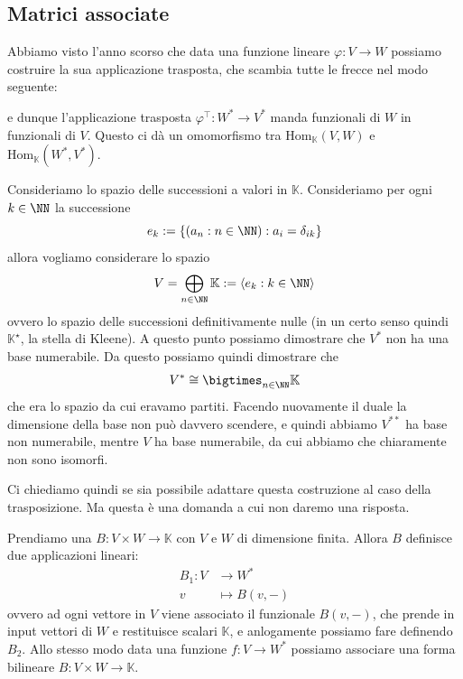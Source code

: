 \documentclass[11pt]{scrartcl}
\newcommand{\KK}{\mathbb{K}}
\begin{document}
	\subsection{Matrici associate}
	Abbiamo visto l'anno scorso che data una funzione lineare $\varphi:V\to W$ possiamo costruire la sua applicazione trasposta, che scambia tutte le frecce nel modo seguente:
	\begin{figure}[h]
		\begin{center}
		\end{center}
	\end{figure}
	e dunque l'applicazione trasposta $\varphi^\intercal:W^*\to V^*$ manda funzionali di $W$ in funzionali di $V$. Questo ci dà un omomorfismo tra $\text{Hom}_\KK(V,W)$ e $\text{Hom}_\KK(W^*,V^*)$.
	\begin{example}
		Consideriamo lo spazio delle successioni a valori in $\KK$. Consideriamo per ogni $k\in \NN$ la successione
		$$e_k:=\left\{\left(a_n:n\in\NN\right):a_i=\delta_{ik}\right\}$$
		allora vogliamo considerare lo spazio 
		$$V=\bigoplus_{n\in\NN}\KK:=\langle e_k:k\in\NN\rangle$$
		ovvero lo spazio delle successioni definitivamente nulle (in un certo senso quindi $\KK^\star$, la stella di Kleene). A questo punto possiamo dimostrare che $V^*$ non ha una base numerabile. Da questo possiamo quindi dimostrare che
		$$V^*\cong \bigtimes_{n\in\NN}\KK$$
		che era lo spazio da cui eravamo partiti. Facendo nuovamente il duale la dimensione della base non può davvero scendere, e quindi abbiamo $V^{**}$ ha base non numerabile, mentre $V$ ha base numerabile, da cui abbiamo che chiaramente non sono isomorfi.
	\end{example}
	Ci chiediamo quindi se sia possibile adattare questa costruzione al caso della trasposizione. Ma questa è una domanda a cui non daremo una risposta.
	\begin{definition}
		Prendiamo una $B:V\times W\to \KK$ con $V$ e $W$ di dimensione finita. Allora $B$ definisce due applicazioni lineari:
		\begin{align*}
			B_1:V & \to W^* \\
			v & \mapsto B(v,-)
		\end{align*}
		ovvero ad ogni vettore in $V$ viene associato il funzionale $B(v,-)$, che prende in input vettori di $W$ e restituisce scalari $\KK$, e anlogamente possiamo fare definendo $B_2$. Allo stesso modo data una funzione $f:V\to W^*$ possiamo associare una forma bilineare $B:V\times W\to \KK$.
	\end{definition}
\end{document}
